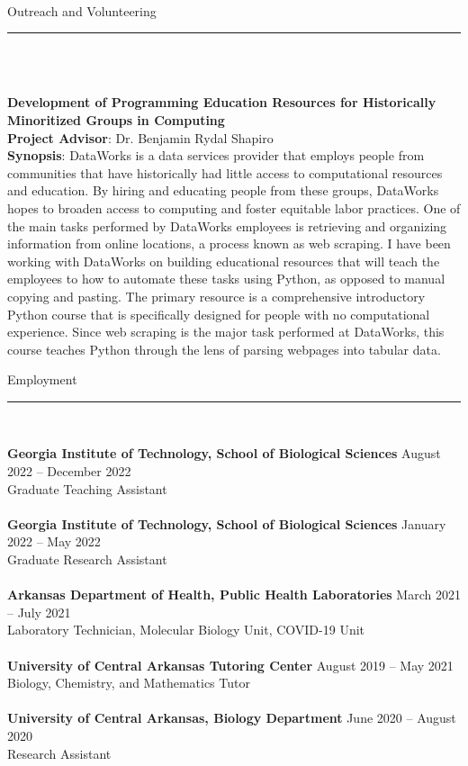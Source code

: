 \documentclass{article}
\begin{document}
\\
\begin{flushleft}
{\Large Outreach and Volunteering} \rule{16.51cm}{0.4pt}\\
\end{flushleft}
\\
\textbf{Development of Programming Education Resources for Historically Minoritized Groups in Computing}\\
\textbf{Project Advisor}: Dr. Benjamin Rydal Shapiro \\
\textbf{Synopsis}: DataWorks is a data services provider that employs people from communities that have historically 
had little access to computational resources and education. By hiring and educating people from these groups, DataWorks
hopes to broaden access to computing and foster equitable labor practices. One of the main tasks performed by DataWorks employees 
is retrieving and organizing information from online locations, a process known as web scraping. I have been working with DataWorks 
on building educational resources that will teach the employees to how to automate these tasks using Python, as opposed to manual copying and pasting.
The primary resource is a comprehensive introductory Python course that is specifically designed for people with no computational experience. 
Since web scraping is the major task performed at DataWorks, this course teaches Python through the lens of parsing webpages into tabular data.
\\
\begin{flushleft}
{\Large Employment} \rule{16.51cm}{0.4pt}\\
\end{flushleft}
\textbf{Georgia Institute of Technology, School of Biological Sciences} \hfill August 2022 – December 2022\\
Graduate Teaching Assistant\\
\\
\textbf{Georgia Institute of Technology, School of Biological Sciences} \hfill January 2022 – May 2022\\
Graduate Research Assistant\\
\\
\textbf{Arkansas Department of Health, Public Health Laboratories} \hfill March 2021 – July 2021\\
Laboratory Technician, Molecular Biology Unit, COVID-19 Unit\\
\\
\textbf{University of Central Arkansas Tutoring Center} \hfill August 2019 – May 2021\\
Biology, Chemistry, and Mathematics Tutor\\
\\
\textbf{University of Central Arkansas, Biology Department} \hfill June 2020 – August 2020\\
Research Assistant\\
\\
\end{document}
